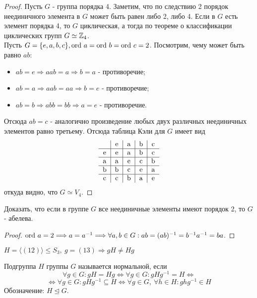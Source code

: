 \begin{proof}
    Пусть $G$ - группа порядка 4. Заметим, что по следствию 2 порядок неединичного элемента в $G$ может быть равен либо 2, либо 4. Если в $G$ есть элемент порядка 4, то $G$ циклическая, а тогда по теореме о классификации циклических групп $G \simeq \mathbb{Z}_4$.\\
    Пусть $G = \{e, a, b, c\}, \textup{ord } a = \textup{ord } b = \textup{ord } c = 2$. Посмотрим, чему может быть равно $ab$:
    \begin{itemize}
        \item $ab = e \Longrightarrow aab = a \Longrightarrow b = a$ - противоречие;
        \item $ab = a \Longrightarrow aab = aa \Longrightarrow b = e$ - противоречие;
        \item $ab = b \Longrightarrow abb = bb \Longrightarrow a = e$ - противоречие.
    \end{itemize}
    Отсюда $ab = c$ - аналогично произведение любых двух различных неединичных элементов равно третьему. Отсюда таблица Кэли для $G$ имеет вид
    $$\begin{tabular}{c|c|c|c|c}
        \null & e & a & b & c \\ \hline
        e & e & a & b & c \\ \hline
        a & a & e & c & b \\ \hline
        b & b & c & e & a \\ \hline
        c & c & b & a & e
        \end{tabular}$$
    откуда видно, что $G \simeq V_4$.
\end{proof}
\begin{exercise}
    Доказать, что если в группе $G$ все неединичные элементы имеют порядок 2, то $G$ - абелева.
\end{exercise}
\begin{proof}
    $\textup{ord } a = 2 \Longrightarrow a = a^{-1} \Longrightarrow \forall a, b \in G: ab = (ab)^{-1} = b^{-1}a^{-1} = ba$.
\end{proof}
\begin{example}
    $H = \langle (12) \rangle \leq S_3,\ g=(13) \Rightarrow gH \neq Hg$
\end{example}
\begin{definition}
    Подгруппа $H$ группы $G$ называется нормальной, если 
    \[\forall g\in G: gH=Hg \Longleftrightarrow \forall g\in G: gHg^{-1}=H \Longleftrightarrow\]
    \[\Longleftrightarrow \forall g\in G: gHg^{-1}\subseteq H \Longleftrightarrow \forall g\in G,\ \forall h\in H: ghg^{-1}\in H\]
    Обозначение: $H\unlhd G$. 
\end{definition} 
